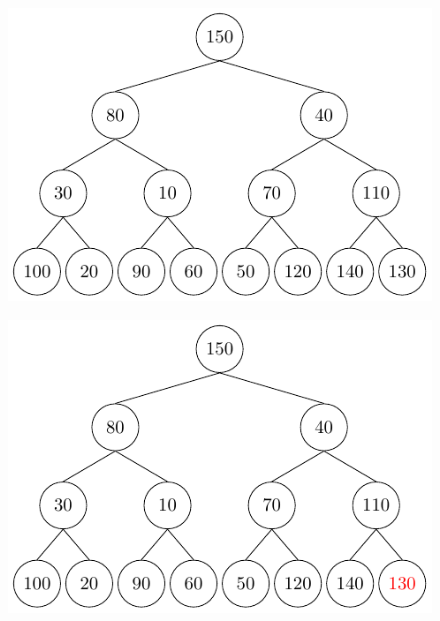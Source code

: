 \begin{center}
\begin{minipage}{0.24\textwidth}
\begin{figure}[H]
  \centering
  \includegraphics[width=\textwidth]{Figure/Percolate1.pdf}
\end{figure}
\end{minipage}
\begin{minipage}{0.24\textwidth}
\begin{figure}[H]
  \centering
  \includegraphics[width=\textwidth]{Figure/Percolate2.pdf}
\end{figure}
\end{minipage}
\begin{minipage}{0.24\textwidth}
\begin{figure}[H]
  \centering

\end{figure}
\end{minipage}
\end{center}
